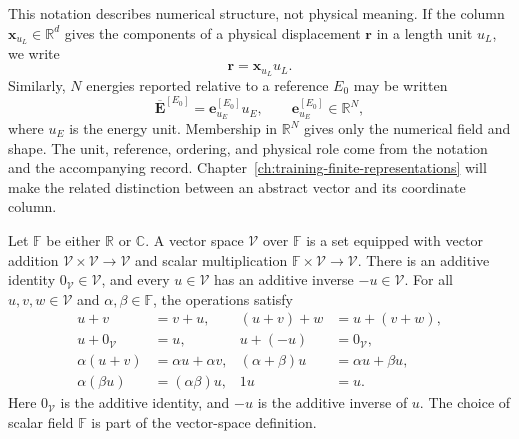 This notation describes numerical structure, not physical meaning. If the
column \(\mathbf x_{u_L}\in\mathbb R^d\) gives the components of a physical
displacement \(\mathbf r\) in a length unit \(u_L\), we write
\begin{equation}
  \mathbf r=\mathbf x_{u_L}u_L.
  \label{eq:training-vector-unit-representation}
\end{equation}
Similarly, \(N\) energies reported relative to a reference \(E_0\) may be
written
\begin{equation}
  \overline{\mathbf E}^{[E_0]}
  =\mathbf e_{u_E}^{[E_0]}u_E,
  \qquad
  \mathbf e_{u_E}^{[E_0]}\in\mathbb R^N,
  \label{eq:training-energy-array-numeric-representation}
\end{equation}
where \(u_E\) is the energy unit. Membership in \(\mathbb R^N\) gives only
the numerical field and shape. The unit, reference, ordering, and physical role
come from the notation and the accompanying record. Chapter~\ref{ch:training-finite-representations}
will make the related distinction between an abstract vector and its coordinate
column.

\begin{definition}
\label{def:training-vector-space}
Let \(\mathbb F\) be either \(\mathbb R\) or \(\mathbb C\). A vector space
\(\mathcal V\) over \(\mathbb F\) is a set equipped with vector addition
\(\mathcal V\times\mathcal V\to\mathcal V\) and scalar multiplication
\(\mathbb F\times\mathcal V\to\mathcal V\). There is an additive identity
\(0_{\mathcal V}\in\mathcal V\), and every \(u\in\mathcal V\) has an
additive inverse \(-u\in\mathcal V\). For all \(u,v,w\in\mathcal V\) and
\(\alpha,\beta\in\mathbb F\), the operations satisfy
\begin{equation}
\begin{aligned}
  u+v&=v+u,
  & (u+v)+w&=u+(v+w),\\
  u+0_{\mathcal V}&=u,
  & u+(-u)&=0_{\mathcal V},\\
  \alpha(u+v)&=\alpha u+\alpha v,
  & (\alpha+\beta)u&=\alpha u+\beta u,\\
  \alpha(\beta u)&=(\alpha\beta)u,
  & 1u&=u.
\end{aligned}
\label{eq:training-vector-space-axioms}
\end{equation}
Here \(0_{\mathcal V}\) is the additive identity, and \(-u\) is the additive
inverse of \(u\). The choice of scalar field \(\mathbb F\) is part of the
vector-space definition.
\end{definition}

